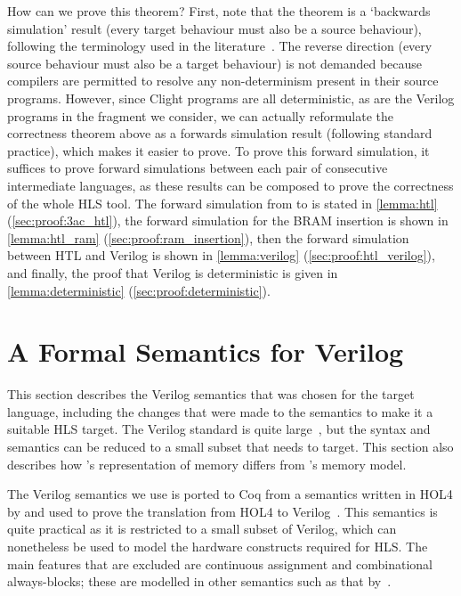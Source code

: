 How can we prove this theorem? First, note that the theorem is a `backwards
simulation' result (every target behaviour must also be a source behaviour),
following the terminology used in the \compcert{}
literature~\cite{leroy09_formal_verif_realis_compil}. The reverse direction
(every source behaviour must also be a target behaviour) is not demanded because
compilers are permitted to resolve any non-determinism present in their source
programs. However, since Clight programs are all deterministic, as are the
Verilog programs in the fragment we consider, we can actually reformulate the
correctness theorem above as a forwards simulation result (following standard
\compcert{} practice), which makes it easier to prove.  To prove this forward
simulation, it suffices to prove forward simulations between each pair of
consecutive intermediate languages, as these results can be composed to prove
the correctness of the whole HLS tool.  The forward simulation from \rtl{} to
\htl{} is stated in \cref{lemma:htl} (\cref{sec:proof:3ac_htl}), the forward
simulation for the \gls{BRAM} insertion is shown in \cref{lemma:htl_ram}
(\cref{sec:proof:ram_insertion}), then the forward simulation between HTL and
Verilog is shown in \cref{lemma:verilog} (\cref{sec:proof:htl_verilog}), and
finally, the proof that Verilog is deterministic is given in
\cref{lemma:deterministic} (\cref{sec:proof:deterministic}).

\section{A Formal Semantics for Verilog}\label{sec:verilog}


This section describes the Verilog semantics that was chosen for the target language, including the changes that were made to the semantics to make it a suitable HLS target.  The Verilog standard is quite large~\cite{06_ieee_stand_veril_hardw_descr_languag,05_ieee_stand_veril_regis_trans_level_synth}, but the syntax and semantics can be reduced to a small subset that \vericert{} needs to target.  This section  also describes how \vericert{}'s representation of memory differs from \compcert{}'s memory model.

The Verilog semantics we use is ported to Coq from a semantics written in HOL4
by \textcite{lööw19_proof_trans_veril_devel_hol} and used to prove the
translation from HOL4 to
Verilog~\cite{lööw19_verif_compil_verif_proces}. %
This semantics is quite practical as it is restricted to a small subset of
Verilog, which can nonetheless be used to model the hardware constructs required
for HLS.  The main features that are excluded are continuous assignment and
combinational always-blocks; these are modelled in other semantics such as that
by~\textcite{meredith10_veril}. %


